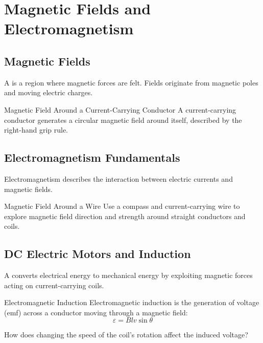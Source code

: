 \FloatBarrier

\section{Magnetic Fields and Electromagnetism}
\FloatBarrier

\subsection{Magnetic Fields}
\FloatBarrier

A  is a region where magnetic forces are felt. Fields originate from magnetic poles and moving electric charges.

\begin{keyconcept}{Magnetic Field Around a Current-Carrying Conductor}
A current-carrying conductor generates a circular magnetic field around itself, described by the right-hand grip rule.
\end{keyconcept}

\subsection{Electromagnetism Fundamentals}
\FloatBarrier

Electromagnetism describes the interaction between electric currents and magnetic fields.

\begin{investigation}{Magnetic Field Around a Wire}
Use a compass and current-carrying wire to explore magnetic field direction and strength around straight conductors and coils.
\end{investigation}

\subsection{DC Electric Motors and Induction}
\FloatBarrier

A  converts electrical energy to mechanical energy by exploiting magnetic forces acting on current-carrying coils.

\begin{keyconcept}{Electromagnetic Induction}
Electromagnetic induction is the generation of voltage (emf) across a conductor moving through a magnetic field:
\[
\varepsilon = B l v \sin\theta
\]
\end{keyconcept}


\begin{stopandthink}
How does changing the speed of the coil's rotation affect the induced voltage?
\end{stopandthink}


\FloatBarrier

